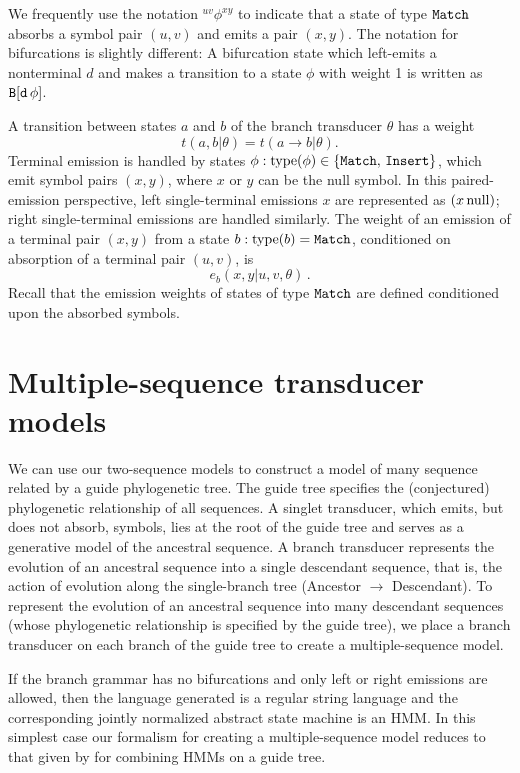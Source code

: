 \documentclass[10pt]{article}
\begin{document}
We frequently use the notation ${}^{uv}\phi^{xy}$ to indicate that a state of type $\mathtt{Match}$ absorbs a symbol pair $(u,v)$
and emits a pair $(x,y)$.
The notation for bifurcations is slightly different:
A bifurcation state which left-emits a nonterminal $d$ and makes a transition to a state $\phi$ with weight 1 is written as $\mathtt{B[d\,\phi]}$.

A transition between states $a$ and $b$ of the branch transducer $\theta$ has a weight
\[ t(a,b|\theta) = t(a \to b|\theta). \]
Terminal emission is handled by states $\phi: \operatorname{type}(\phi) \in \{\mathtt{Match},\,\mathtt{Insert}\}$, which emit symbol pairs $(x,y)$,
where $x$ or $y$ can be the null symbol.
In this paired-emission perspective, left single-terminal emissions $x$ are represented as $(x\,\mathrm{null})$;
right single-terminal emissions are handled similarly.
The weight of an emission of a terminal pair $(x,y)$ from a state $b: \operatorname{type}(b) = \mathtt{Match}$, 
conditioned on absorption of a terminal pair $(u,v)$, is 
\[ e_b ( x,y|u,v,\theta ) \, . \]
Recall that the emission weights of states of type $\mathtt{Match}$ are defined conditioned upon the absorbed symbols.


\newpage
\section{Multiple-sequence transducer models} 

We can use our two-sequence models to construct a model of many sequence related by a
guide phylogenetic tree.
The guide tree specifies the (conjectured) phylogenetic relationship of all sequences.
A singlet transducer, which emits, but does not absorb, symbols, lies at the root of the guide tree and 
serves as a generative model of the ancestral sequence.
A branch transducer represents the evolution of an ancestral sequence into a single descendant 
sequence, that is, the action of evolution along the single-branch tree (Ancestor $\to$ Descendant).
To represent the evolution of an ancestral sequence into many descendant sequences
(whose phylogenetic relationship is specified by the guide tree),
we place a branch transducer on each branch of the guide tree to create a multiple-sequence model.

If the branch grammar has no bifurcations and only left or right emissions are allowed, then
the language generated is a regular string language and the corresponding jointly normalized abstract state machine is 
an HMM.  In this simplest case our formalism for creating a multiple-sequence model reduces to that given 
by \cite{Holmes2003} for combining HMMs on a guide tree.
\end{document}
